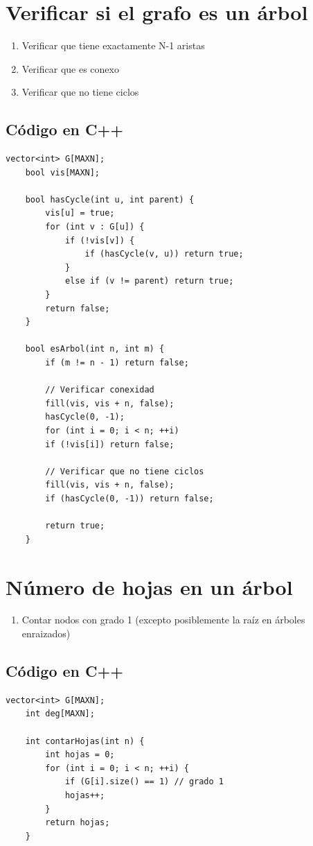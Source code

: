\section{Verificar si el grafo es un árbol}

\begin{enumerate}
	\item Verificar que tiene exactamente N-1 aristas
	\item Verificar que es conexo
	\item Verificar que no tiene ciclos
\end{enumerate}

\subsection*{Código en C++}

\begin{lstlisting}[caption=Verificar si grafo es árbol]
	vector<int> G[MAXN];
	bool vis[MAXN];
	
	bool hasCycle(int u, int parent) {
		vis[u] = true;
		for (int v : G[u]) {
			if (!vis[v]) {
				if (hasCycle(v, u)) return true;
			}
			else if (v != parent) return true;
		}
		return false;
	}
	
	bool esArbol(int n, int m) {
		if (m != n - 1) return false;
		
		// Verificar conexidad
		fill(vis, vis + n, false);
		hasCycle(0, -1);
		for (int i = 0; i < n; ++i)
		if (!vis[i]) return false;
		
		// Verificar que no tiene ciclos
		fill(vis, vis + n, false);
		if (hasCycle(0, -1)) return false;
		
		return true;
	}
\end{lstlisting}

\section{Número de hojas en un árbol}

\begin{enumerate}
	\item Contar nodos con grado 1 (excepto posiblemente la raíz en árboles enraizados)
\end{enumerate}

\subsection*{Código en C++}

\begin{lstlisting}[caption=Contar hojas en un árbol]
	vector<int> G[MAXN];
	int deg[MAXN];
	
	int contarHojas(int n) {
		int hojas = 0;
		for (int i = 0; i < n; ++i) {
			if (G[i].size() == 1) // grado 1
			hojas++;
		}
		return hojas;
	}
\end{lstlisting}

